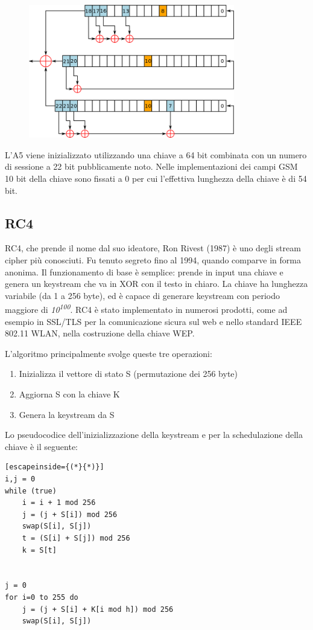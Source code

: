 \begin{figure}[htb!]
    \centering
    \includegraphics[width=9cm]{./Images/cap1/1.35.png}
\end{figure} 

L'A5 viene inizializzato utilizzando una chiave a 64 bit combinata con un numero di sessione a 22 bit pubblicamente noto. Nelle implementazioni dei campi GSM 10 bit della chiave sono fissati a 0  per cui l'effettiva lunghezza della chiave è di 54 bit. 

\subsection{RC4}
RC4, che prende il nome dal suo ideatore, Ron Rivest (1987) è uno degli stream cipher più conosciuti. Fu tenuto segreto fino al 1994, quando comparve in forma anonima. Il funzionamento di base è semplice: prende in input una chiave e genera un keystream che va in XOR con il testo in chiaro. La chiave ha lunghezza variabile (da 1 a 256 byte), ed è capace di generare keystream con periodo maggiore di \textit{10\textsuperscript{100}}. RC4 è stato implementato in numerosi prodotti, come ad esempio in SSL/TLS per la comunicazione sicura sul web e nello standard IEEE 802.11 WLAN, nella costruzione della chiave WEP.  

L'algoritmo principalmente svolge queste tre operazioni:
\begin{enumerate}
    \item Inizializza il vettore di stato S (permutazione dei 256 byte)
    \item Aggiorna S con la chiave K
    \item Genera la keystream da S
\end{enumerate}
Lo pseudocodice dell'inizializzazione della keystream e per la schedulazione della chiave è il seguente:
\begin{lstlisting}[escapeinside={(*}{*)}]
i,j = 0
while (true)
    i = i + 1 mod 256
    j = (j + S[i]) mod 256
    swap(S[i], S[j])
    t = (S[i] + S[j]) mod 256
    k = S[t]
    
    
j = 0
for i=0 to 255 do
    j = (j + S[i] + K[i mod h]) mod 256
    swap(S[i], S[j])
\end{lstlisting}

